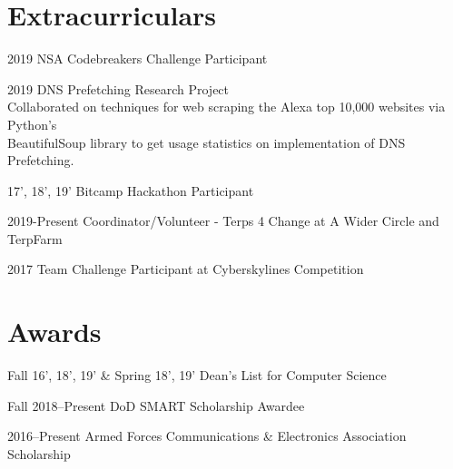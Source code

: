 \documentclass[print]{friggeri-cv} %
\begin{document}
%
%


\section{Extracurriculars}

\begin{entrylist}


\entrynobold
{2019}
{NSA Codebreakers Challenge Participant}
{}
{}


\entrynobold
{2019}
{DNS Prefetching Research Project}
{\\ \hspace*{.25cm} Collaborated on techniques for web scraping the Alexa top 10,000 websites via Python's \\ \hspace*{.25cm} BeautifulSoup library to get usage statistics on implementation of DNS Prefetching.}
{}

\entrynobold
{17', 18', 19'}
{Bitcamp Hackathon Participant}
{}
{}


\entrynobold
{2019-Present}
{Coordinator/Volunteer - Terps 4 Change at A Wider Circle and TerpFarm}
{}
{}

\entrynobold
{2017}
{Team Challenge Participant at Cyberskylines Competition}
{}
{}



\end{entrylist}


\section{Awards}

\begin{entrylist}

\entrynobold
{Fall 16', 18', 19' \& Spring 18', 19'}
{Dean's List for Computer Science}
{}
{}

\entrynobold
{Fall 2018--Present}
{DoD SMART Scholarship Awardee}
{}
{}

\entrynobold
{2016--Present}
{Armed Forces Communications \& Electronics Association Scholarship}
{}
{}


\end{entrylist}
\clearpage
\end{document}
